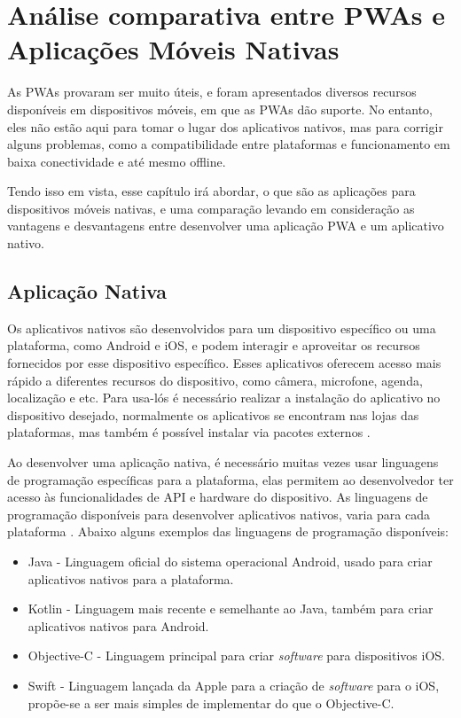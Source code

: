 \chapter{\textbf{Análise comparativa entre PWAs e Aplicações Móveis Nativas}}

As \ac{PWA}s provaram ser muito úteis, e foram apresentados diversos recursos disponíveis em dispositivos móveis, em que as \ac{PWA}s dão suporte. No entanto, eles não estão aqui para tomar o lugar dos aplicativos nativos, mas para corrigir alguns problemas, como a compatibilidade entre plataformas e funcionamento em baixa conectividade e até mesmo offline.

Tendo isso em vista, esse capítulo irá abordar, o que são as aplicações para dispositivos móveis nativas, e uma comparação levando em consideração as vantagens e desvantagens entre desenvolver uma aplicação \ac{PWA} e um aplicativo nativo.

\section{Aplicação Nativa}
Os aplicativos nativos são desenvolvidos para um dispositivo específico ou uma plataforma, como Android e iOS, e podem interagir e aproveitar os recursos fornecidos por esse dispositivo específico. Esses aplicativos oferecem acesso mais rápido a diferentes recursos do dispositivo, como câmera, microfone, agenda, localização e etc.
Para usa-lós é necessário realizar a instalação do aplicativo no dispositivo desejado, normalmente os aplicativos se encontram nas lojas das plataformas, mas também é possível instalar via pacotes externos \cite{native}.

Ao desenvolver uma aplicação nativa, é necessário muitas vezes usar linguagens de programação específicas para a plataforma, elas permitem ao desenvolvedor ter acesso às funcionalidades de \ac{API} e hardware do dispositivo. As linguagens de programação disponíveis para desenvolver aplicativos nativos, varia para cada plataforma \cite{native}. Abaixo alguns exemplos das linguagens de programação disponíveis:

\begin{itemize}
	\item Java - Linguagem oficial do sistema operacional Android, usado para criar aplicativos nativos para a plataforma.
	\item Kotlin - Linguagem mais recente e semelhante ao Java, também para criar aplicativos nativos para Android.
	\item Objective-C - Linguagem principal para criar \textit{software} para dispositivos iOS.
	\item Swift -  Linguagem lançada da Apple para a criação de \textit{software} para o iOS, propõe-se a ser mais simples de implementar do que o Objective-C.
\end{itemize}

